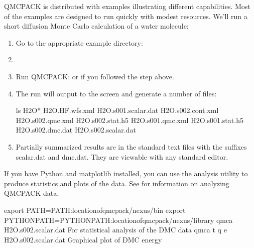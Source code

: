 \documentclass[letterpaper,10pt,english]{sphinxmanual}
\begin{document}
QMCPACK is distributed with examples illustrating different
capabilities. Most of the examples are designed to run quickly with
modest resources. We’ll run a short diffusion Monte Carlo calculation of
a water molecule:
\begin{enumerate}
%
\item {} 
Go to the appropriate example directory: 

\item {} 

\item {} 
Run QMCPACK:  or  if you followed the step above.

\item {} 
The run will output to the screen and generate a number of files:

\begin{sphinxVerbatim}[commandchars=\\\{\}]
\PYGZdl{}ls H2O*
H2O.HF.wfs.xml      H2O.s001.scalar.dat H2O.s002.cont.xml
H2O.s002.qmc.xml    H2O.s002.stat.h5    H2O.s001.qmc.xml
H2O.s001.stat.h5    H2O.s002.dmc.dat    H2O.s002.scalar.dat
\end{sphinxVerbatim}

\item {} 
Partially summarized results are in the standard text files with the
suffixes scalar.dat and dmc.dat. They are viewable with any standard
editor.

\end{enumerate}

If you have Python and matplotlib installed, you can use the analysis
utility to produce statistics and plots of the data. See
 for information on
analyzing QMCPACK data.

\begin{sphinxVerbatim}[commandchars=\\\{\}]
export PATH=\PYGZdl{}PATH:location\PYGZhy{}of\PYGZhy{}qmcpack/nexus/bin
export PYTHONPATH=\PYGZdl{}PYTHONPATH:location\PYGZhy{}of\PYGZhy{}qmcpack/nexus/library
qmca H2O.s002.scalar.dat         \PYGZsh{} For statistical analysis of the DMC data
qmca \PYGZhy{}t \PYGZhy{}q e H2O.s002.scalar.dat \PYGZsh{} Graphical plot of DMC energy
\end{sphinxVerbatim}
\end{document}
